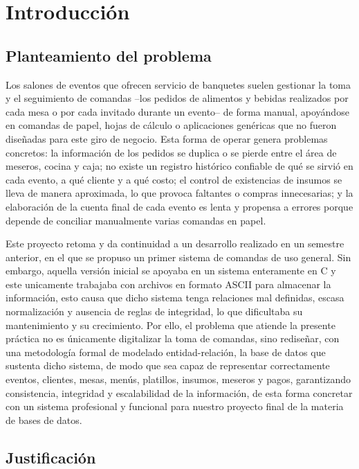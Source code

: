 \newpage

\section{Introducción}
\label{sec:introducción}

\subsection{Planteamiento del problema}

Los salones de eventos que ofrecen servicio de banquetes suelen gestionar la toma y el seguimiento de comandas --los pedidos de alimentos y bebidas realizados por cada mesa o por cada invitado durante un evento-- de forma manual, apoyándose en comandas de papel, hojas de cálculo o aplicaciones genéricas que no fueron diseñadas para este giro de negocio. Esta forma de operar genera problemas concretos: la información de los pedidos se duplica o se pierde entre el área de meseros, cocina y caja; no existe un registro histórico confiable de qué se sirvió en cada evento, a qué cliente y a qué costo; el control de existencias de insumos se lleva de manera aproximada, lo que provoca faltantes o compras innecesarias; y la elaboración de la cuenta final de cada evento es lenta y propensa a errores porque depende de conciliar manualmente varias comandas en papel.

Este proyecto retoma y da continuidad a un desarrollo realizado en un semestre anterior, en el que se propuso un primer sistema de comandas de uso general. Sin embargo, aquella versión inicial se apoyaba en un sistema enteramente en C y este unicamente trabajaba con archivos en formato ASCII para almacenar la información, esto causa que dicho sistema tenga relaciones mal definidas, escasa normalización y ausencia de reglas de integridad, lo que dificultaba su mantenimiento y su crecimiento. Por ello, el problema que atiende la presente práctica no es únicamente digitalizar la toma de comandas, sino rediseñar, con una metodología formal de modelado entidad-relación, la base de datos que sustenta dicho sistema, de modo que sea capaz de representar correctamente eventos, clientes, mesas, menús, platillos, insumos, meseros y pagos, garantizando consistencia, integridad y escalabilidad de la información, de esta forma concretar con un sistema profesional y funcional para nuestro proyecto final de la materia de bases de datos.

\subsection{Justificación}

